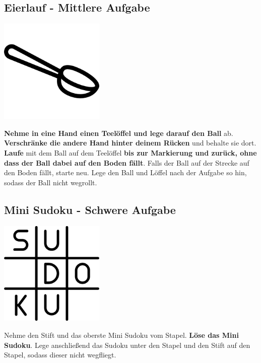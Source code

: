 \subsection{Eierlauf - Mittlere Aufgabe}
\vfill
\begin{center}
    \includegraphics[height=5cm]{graphics/spoon.png}
\end{center}
\vfill
\textbf{Nehme in eine Hand einen Teelöffel und lege darauf den Ball}
ab.
\textbf{Verschränke die andere Hand hinter deinem Rücken} und behalte sie dort.
\textbf{Laufe} mit dem Ball auf dem Teelöffel \textbf{bis zur Markierung und
zurück, ohne dass
der Ball dabei auf den Boden fällt}. Falls der Ball auf der Strecke auf den Boden
fällt, starte neu.
Lege den Ball und Löffel nach der Aufgabe so hin, sodass der Ball nicht
wegrollt.
\newline
\newpage

\subsection{Mini Sudoku - Schwere Aufgabe}
\vfill
\begin{center}
    \includegraphics[height=5cm]{graphics/sudoku.png}
\end{center}
\vfill
Nehme den Stift und das oberste Mini Sudoku vom Stapel.
\textbf{Löse das Mini Sudoku}.
Lege anschließend das Sudoku unter den Stapel und den Stift auf den Stapel,
sodass dieser nicht wegfliegt.
\newline
\newpage




